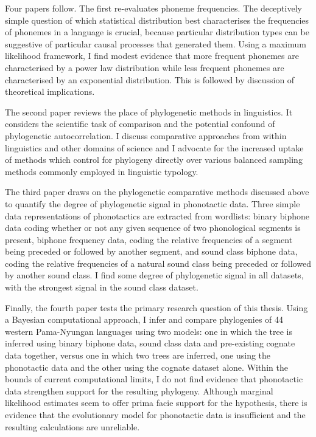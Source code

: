 Four papers follow. The first re-evaluates phoneme frequencies. The deceptively simple question of which statistical distribution best characterises the frequencies of phonemes in a language is crucial, because particular distribution types can be suggestive of particular causal processes that generated them. Using a maximum likelihood framework, I find modest evidence that more frequent phonemes are characterised by a power law distribution while less frequent phonemes are characterised by an exponential distribution. This is followed by discussion of theoretical implications.

The second paper reviews the place of phylogenetic methods in linguistics. It considers the scientific task of comparison and the potential confound of phylogenetic autocorrelation. I discuss comparative approaches from within linguistics and other domains of science and I advocate for the increased uptake of methods which control for phylogeny directly over various balanced sampling methods commonly employed in linguistic typology.

The third paper draws on the phylogenetic comparative methods discussed above to quantify the degree of phylogenetic signal in phonotactic data. Three simple data representations of phonotactics are extracted from wordlists: binary biphone data coding whether or not any given sequence of two phonological segments is present, biphone frequency data, coding the relative frequencies of a segment being preceded or followed by another segment, and sound class biphone data, coding the relative frequencies of a natural sound class being preceded or followed by another sound class. I find some degree of phylogenetic signal in all datasets, with the strongest signal in the sound class dataset.

Finally, the fourth paper tests the primary research question of this thesis. Using a Bayesian computational approach, I infer and compare phylogenies of 44 western Pama-Nyungan languages using two models: one in which the tree is inferred using binary biphone data, sound class data and pre-existing cognate data together, versus one in which two trees are inferred, one using the phonotactic data and the other using the cognate dataset alone. Within the bounds of current computational limits, I do not find evidence that phonotactic data strengthen support for the resulting phylogeny. Although marginal likelihood estimates seem to offer prima facie support for the hypothesis, there is evidence that the evolutionary model for phonotactic data is insufficient and the resulting calculations are unreliable.

